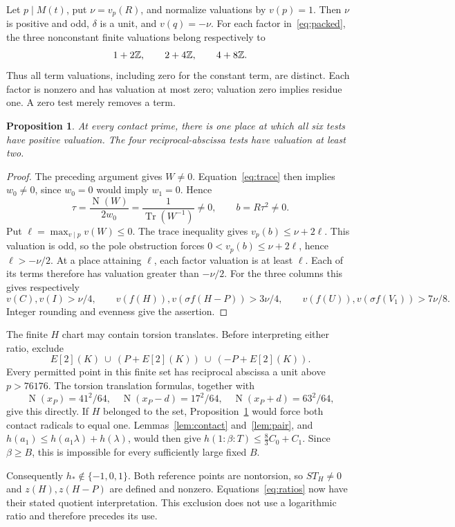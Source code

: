 \documentclass[11pt,a4paper]{article}
\newtheorem{proposition}[theorem]{Proposition}
\DeclareMathOperator{\Tr}{Tr}\DeclareMathOperator{\Nm}{N}
\begin{document}
Let $p\mid M(t)$, put $\nu=v_p(R)$, and normalize valuations by
$v(p)=1$. Then $\nu$ is positive and odd, $\delta$ is a unit, and
$v(q)=-\nu$. For each factor in~\eqref{eq:packed}, the three
nonconstant finite valuations belong respectively to
\[
                     1+2\mathbb Z,\qquad 2+4\mathbb Z,\qquad4+8\mathbb Z.
\]
Thus all term valuations, including zero for the constant term, are
distinct. Each factor is nonzero and has valuation at most zero;
valuation zero implies residue one. A zero test merely removes a term.

\begin{proposition}\label{prop:local}
At every contact prime, there is one place at which all six tests have
positive valuation. The four reciprocal-abscissa tests have valuation
at least two.
\end{proposition}
\begin{proof}
The preceding argument gives $W\ne0$. Equation~\eqref{eq:trace} then
implies $w_0\ne0$, since $w_0=0$ would imply $w_1=0$. Hence
\[
 \tau=\frac{\Nm(W)}{2w_0}=\frac1{\Tr(W^{-1})}\ne0,
 \qquad b=R\tau^2\ne0.
\]
Put $\ell=\max_{v\mid p}v(W)\le0$. The trace inequality gives
$v_p(b)\le\nu+2\ell$. This valuation is odd, so the pole obstruction
forces $0<v_p(b)\le\nu+2\ell$, hence $\ell>-\nu/2$.
At a place attaining $\ell$, each factor valuation is at least $\ell$.
Each of its terms therefore has valuation greater than $-\nu/2$.
For the three columns this gives respectively
\[
 v(C),v(I)>\nu/4,\qquad
 v(f(H)),v(\sigma f(H-P))>3\nu/4,\qquad
 v(f(U)),v(\sigma f(V_1))>7\nu/8.
\]
Integer rounding and evenness give the assertion.
\end{proof}

The finite $H$ chart may contain torsion translates. Before interpreting
either ratio, exclude
\[
                  E[2](K)\ \cup\ (P+E[2](K))\ \cup\ (-P+E[2](K)).
\]
Every permitted point in this finite set has reciprocal abscissa a unit
above $p>76176$. The torsion translation formulas, together with
\[
 \Nm(x_P)=41^2/64,\quad
 \Nm(x_P-d)=17^2/64,\quad \Nm(x_P+d)=63^2/64,
\]
give this directly. If $H$ belonged to the set, Proposition~\ref{prop:local}
would force both contact radicals to equal one. Lemmas~\ref{lem:contact}
and~\ref{lem:pair}, and $h(a_1)\le h(a_1\lambda)+h(\lambda)$, would
then give $h(1:\beta:T)\le\frac83C_0+C_1$. Since $\beta\ge B$, this is
impossible for every sufficiently large fixed $B$.

Consequently $h_*\notin\{-1,0,1\}$. Both reference points are
nontorsion, so $S T_H\ne0$ and $z(H),z(H-P)$ are defined and nonzero.
Equations~\eqref{eq:ratios} now have their stated quotient interpretation.
This exclusion does not use a logarithmic ratio and therefore precedes
its use.
\end{document}
